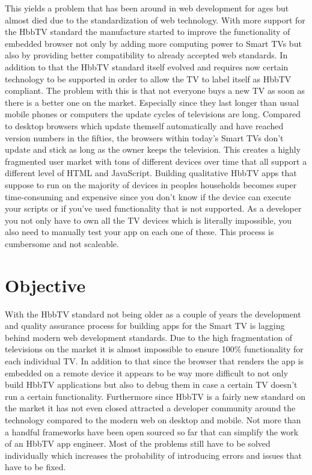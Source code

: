 This yields a problem that has been around in web development for ages but almost died due to the standardization of web technology. With more support for the HbbTV standard the manufacture started to improve the functionality of embedded browser not only by adding more computing power to Smart TVs but also by providing better compatibility to already accepted web standards. In addition to that the HbbTV standard itself evolved and requires now certain technology to be supported in order to allow the TV to label itself as HbbTV compliant. The problem with this is that not everyone buys a new TV as soon as there is a better one on the market. Especially since they last longer than usual mobile phones or computers the update cycles of televisions are long. Compared to desktop browsers which update themself automatically and have reached version numbers in the fifties, the browsers within today's Smart TVs don't update and stick as long as the owner keeps the television. This creates a highly fragmented user market with tons of different devices over time that all support a different level of HTML and JavaScript. Building qualitative HbbTV apps that suppose to run on the majority of devices in peoples households becomes super time-consuming and expensive since you don't know if the device can execute your scripts or if you've used functionality that is not supported. As a developer you not only have to own all the TV devices which is literally impossible, you also need to manually test your app on each one of these. This process is cumbersome and not scaleable.

\section{Objective\label{sec:objective}}

With the HbbTV standard not being older as a couple of years the development and quality assurance process for building apps for the Smart TV is lagging behind modern web development standards. Due to the high fragmentation of televisions on the market it is almost impossible to ensure 100\% functionality for each individual TV. In addition to that since the browser that renders the app is embedded on a remote device it appears to be way more difficult to not only build HbbTV applications but also to debug them in case a certain TV doesn't run a certain functionality. Furthermore since HbbTV is a fairly new standard on the market it has not even closed attracted a developer community around the technology compared to the modern web on desktop and mobile. Not more than a handful frameworks have been open sourced so far that can simplify the work of an HbbTV app engineer. Most of the problems still have to be solved individually which increases the probability of introducing errors and issues that have to be fixed.

